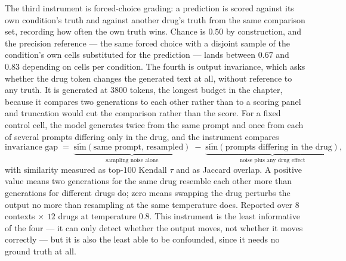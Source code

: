 

The third instrument is forced-choice grading: a prediction is scored against its own condition's
truth and against another drug's truth from the same comparison set, recording how often the own
truth wins. Chance is $0.50$ by construction, and the precision reference --- the same forced choice
with a disjoint sample of the condition's own cells substituted for the prediction --- lands
between $0.67$ and $0.83$ depending on
cells per condition. The fourth is output invariance, which asks whether the drug token changes the
generated text at all, without reference to any truth. It is generated at $3800$ tokens, the
longest budget in the chapter, because it compares two generations to each other rather than to a
scoring panel and truncation would cut the comparison rather than the score. For a fixed control cell, the model generates
twice from the same prompt and once from each of several prompts differing only in the drug, and the
instrument compares
\begin{equation}
 \textrm{invariance gap} \;=\;
 \underbrace{\overline{\textrm{sim}}(\textrm{same prompt, resampled})}_{\textrm{sampling noise alone}}
 \;-\; \underbrace{\overline{\textrm{sim}}(\textrm{prompts differing in the drug})}_{\textrm{noise plus any drug effect}},
\end{equation}
with similarity measured as top-$100$ Kendall $\tau$ and as Jaccard overlap. A positive value means
two generations for the same drug resemble each other more than generations for different drugs do;
zero means swapping the drug perturbs the output no more than resampling at the same temperature
does. Reported over $8$ contexts $\times$ $12$ drugs at temperature $0.8$. This instrument is the
least informative of the four --- it can only detect whether the output moves, not whether it moves correctly
--- but it is also the least able to be confounded, since it needs no ground truth at all.


